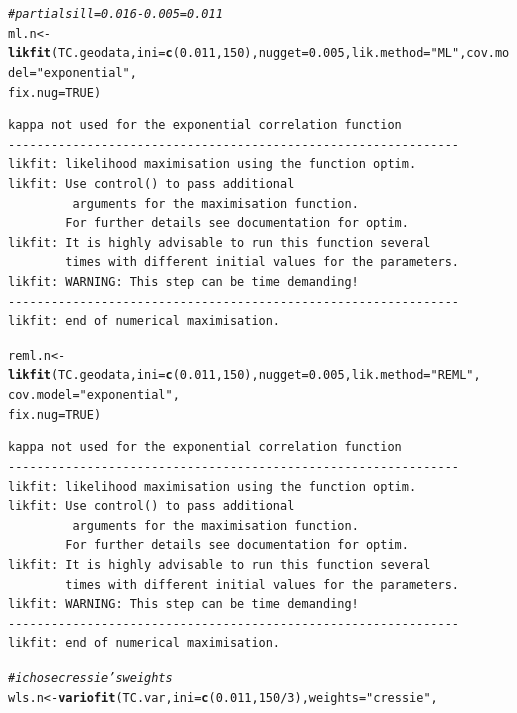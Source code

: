 \documentclass{article}\usepackage[]{graphicx}\usepackage[]{color}
\makeatletter
\newcommand{\hlnum}[1]{\textcolor[rgb]{0.686,0.059,0.569}{#1}}%
\newcommand{\hlstr}[1]{\textcolor[rgb]{0.192,0.494,0.8}{#1}}%
\newcommand{\hlcom}[1]{\textcolor[rgb]{0.678,0.584,0.686}{\textit{#1}}}%
\newcommand{\hlopt}[1]{\textcolor[rgb]{0,0,0}{#1}}%
\newcommand{\hlstd}[1]{\textcolor[rgb]{0.345,0.345,0.345}{#1}}%
\newcommand{\hlkwb}[1]{\textcolor[rgb]{0.69,0.353,0.396}{#1}}%
\newcommand{\hlkwc}[1]{\textcolor[rgb]{0.333,0.667,0.333}{#1}}%
\newcommand{\hlkwd}[1]{\textcolor[rgb]{0.737,0.353,0.396}{\textbf{#1}}}%
\newenvironment{kframe}{%
 \def\at@end@of@kframe{}%
 \ifinner\ifhmode%
  \def\at@end@of@kframe{\end{minipage}}%
  \begin{minipage}{\columnwidth}%
 \fi\fi%
 \def\FrameCommand##1{\hskip\@totalleftmargin \hskip-\fboxsep
 \colorbox{shadecolor}{##1}\hskip-\fboxsep
     \hskip-\linewidth \hskip-\@totalleftmargin \hskip\columnwidth}%
 \MakeFramed {\advance\hsize-\width
   \@totalleftmargin\z@ \linewidth\hsize
   \@setminipage}}%
 {\par\unskip\endMakeFramed%
 \at@end@of@kframe}
\newenvironment{knitrout}{}{} %
\makeatother
\begin{document}
\begin{enumerate}
\begin{enumerate}
\begin{knitrout}
\begin{kframe}
\begin{alltt}
\hlcom{# partial sill = 0.016-0.005=0.011}
\hlstd{ml.n} \hlkwb{<-} \hlkwd{likfit}\hlstd{(TC.geodata,} \hlkwc{ini} \hlstd{=} \hlkwd{c}\hlstd{(}\hlnum{0.011}\hlstd{,}\hlnum{150}\hlstd{),} \hlkwc{nugget} \hlstd{=} \hlnum{0.005}\hlstd{,} \hlkwc{lik.method} \hlstd{=} \hlstr{"ML"}\hlstd{,} \hlkwc{cov.model} \hlstd{=} \hlstr{"exponential"}\hlstd{,}
               \hlkwc{fix.nug} \hlstd{=} \hlnum{TRUE}\hlstd{)}
\end{alltt}
\begin{verbatim}
kappa not used for the exponential correlation function
---------------------------------------------------------------
likfit: likelihood maximisation using the function optim.
likfit: Use control() to pass additional
         arguments for the maximisation function.
        For further details see documentation for optim.
likfit: It is highly advisable to run this function several
        times with different initial values for the parameters.
likfit: WARNING: This step can be time demanding!
---------------------------------------------------------------
likfit: end of numerical maximisation.
\end{verbatim}
\begin{alltt}
\hlstd{reml.n} \hlkwb{<-} \hlkwd{likfit}\hlstd{(TC.geodata,} \hlkwc{ini} \hlstd{=} \hlkwd{c}\hlstd{(}\hlnum{0.011}\hlstd{,}\hlnum{150}\hlstd{),} \hlkwc{nugget} \hlstd{=} \hlnum{0.005}\hlstd{,} \hlkwc{lik.method} \hlstd{=} \hlstr{"REML"}\hlstd{,}
                  \hlkwc{cov.model} \hlstd{=} \hlstr{"exponential"}\hlstd{,}
               \hlkwc{fix.nug} \hlstd{=} \hlnum{TRUE}\hlstd{)}
\end{alltt}
\begin{verbatim}
kappa not used for the exponential correlation function
---------------------------------------------------------------
likfit: likelihood maximisation using the function optim.
likfit: Use control() to pass additional
         arguments for the maximisation function.
        For further details see documentation for optim.
likfit: It is highly advisable to run this function several
        times with different initial values for the parameters.
likfit: WARNING: This step can be time demanding!
---------------------------------------------------------------
likfit: end of numerical maximisation.
\end{verbatim}
\begin{alltt}
\hlcom{# i chose cressie's weights}
\hlstd{wls.n} \hlkwb{<-} \hlkwd{variofit}\hlstd{(TC.var,} \hlkwc{ini} \hlstd{=} \hlkwd{c}\hlstd{(}\hlnum{0.011}\hlstd{,}\hlnum{150}\hlopt{/}\hlnum{3}\hlstd{),} \hlkwc{weights} \hlstd{=} \hlstr{"cressie"}\hlstd{,}

\end{alltt}
\end{kframe}
\end{knitrout}
\end{enumerate}
\end{enumerate}
\end{document}
